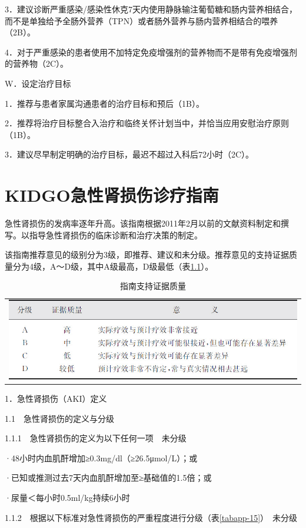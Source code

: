 3．建议诊断严重感染/感染性休克7天内使用静脉输注葡萄糖和肠内营养相结合，而不是单独给予全肠外营养（TPN）或者肠外营养与肠内营养相结合的喂养（2B）。

4．对于严重感染的患者使用不加特定免疫增强剂的营养物而不是带有免疫增强剂的营养物（2C）。

W．设定治疗目标

1．推荐与患者家属沟通患者的治疗目标和预后（1B）。

2．推荐将治疗目标整合入治疗和临终关怀计划当中，并恰当应用安慰治疗原则（1B）。

3．建议尽早制定明确的治疗目标，最迟不超过入科后72小时（2C）。

\protect\hypertarget{text00038.html}{}{}

\chapter{KIDGO急性肾损伤诊疗指南}

急性肾损伤的发病率逐年升高。该指南根据2011年2月以前的文献资料制定和撰写。以指导急性肾损伤的临床诊断和治疗决策的制定。

该指南推荐意见的级别分为3级，即推荐、建议和未分级。推荐意见的支持证据质量分为4级，A～D级，其中A级最高，D级最低（表\ref{tabapp-14}）。

\begin{longtable}{c}
  \caption{指南支持证据质量}
  \label{tabapp-14}
  \endfirsthead
  \caption[]{指南支持证据质量}
  \endhead
\includegraphics[width=\textwidth,height=\textheight,keepaspectratio]{./images/Image00318.jpg}
\end{longtable}

1．急性肾损伤（AKI）定义

1.1　急性肾损伤的定义与分级

1.1.1　急性肾损伤的定义为以下任何一项　未分级

·48小时内血肌酐增加≥0.3mg/dl（≥26.5μmol/L）；或

·已知或推测过去7天内血肌酐增加至≥基础值的1.5倍；或

·尿量＜每小时0.5ml/kg持续6小时

1.1.2　根据以下标准对急性肾损伤的严重程度进行分级（表\ref{tabapp-15}）　未分级

